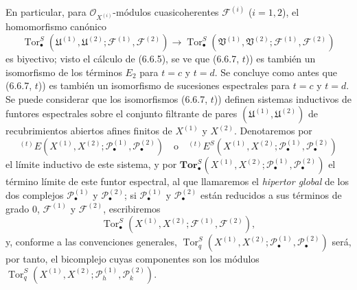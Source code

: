 \begin{env}[6.6.7]
En particular, para $\mathscr O_{X^{(i)}}$-módulos cuasicoherentes
$\mathscr F^{(i)}$ ($i=1,2$), el homomorfismo canónico
\[
  \operatorname{Tor}_\bullet^S
  (\mathfrak U^{(1)},\mathfrak U^{(2)};
   \mathscr F^{(1)},\mathscr F^{(2)})
  \longrightarrow
  \operatorname{Tor}_\bullet^S
  (\mathfrak V^{(1)},\mathfrak V^{(2)};
   \mathscr F^{(1)},\mathscr F^{(2)})
\]
es biyectivo; visto el cálculo de (6.6.5), se ve que (6.6.7, $t$)) es también
un isomorfismo de los términos $E_2$ para $t=c$ y $t=d$. Se concluye como
antes que (6.6.7, $t$)) es también un isomorfismo de sucesiones espectrales
para $t=c$ y $t=d$.
Se puede considerar que los isomorfismos (6.6.7, $t$)) definen sistemas
inductivos de funtores espectrales sobre el conjunto filtrante de pares
$(\mathfrak U^{(1)},\mathfrak U^{(2)})$ de recubrimientos abiertos afines
finitos de $X^{(1)}$ y $X^{(2)}$. Denotaremos por
\[
  {}^{(t)}E
  (X^{(1)},X^{(2)};
   \mathscr P_\bullet^{(1)},\mathscr P_\bullet^{(2)})
  \quad\text{o}\quad
  {}^{(t)}E^S
  (X^{(1)},X^{(2)};
   \mathscr P_\bullet^{(1)},\mathscr P_\bullet^{(2)})
\]
el límite inductivo de este sistema, y por
$\mathbf{Tor}_\bullet^S
(X^{(1)},X^{(2)};\mathscr P_\bullet^{(1)},\mathscr P_\bullet^{(2)})$
el término límite de este funtor espectral, al que llamaremos el
\emph{hipertor global} de los dos complejos $\mathscr P_\bullet^{(1)}$ y
$\mathscr P_\bullet^{(2)}$; si $\mathscr P_\bullet^{(1)}$ y
$\mathscr P_\bullet^{(2)}$ están reducidos a sus términos de grado 0,
$\mathscr F^{(1)}$ y $\mathscr F^{(2)}$, escribiremos
\[
  \operatorname{Tor}_\bullet^S
  (X^{(1)},X^{(2)};\mathscr F^{(1)},\mathscr F^{(2)}),
\]
y, conforme a las convenciones generales,
$
  \operatorname{Tor}_q^S
  (X^{(1)},X^{(2)};\mathscr P_\bullet^{(1)},\mathscr P_\bullet^{(2)})
$
será, por tanto, el bicomplejo cuyas componentes son los módulos
$
  \operatorname{Tor}_q^S
  (X^{(1)},X^{(2)};\mathscr P_h^{(1)},\mathscr P_k^{(2)})$.
\end{env}


